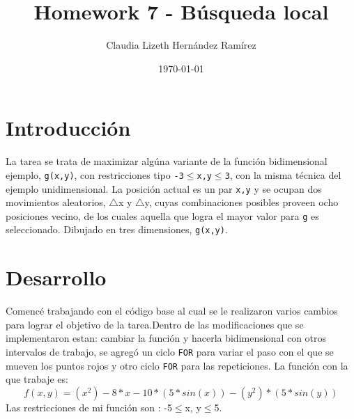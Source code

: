 \documentclass{article}
\author{Claudia Lizeth Hern\'andez Ram\'irez} %
\title{Homework 7 - B\'usqueda local} %
\date{\today}
\begin{document}

\maketitle %



\section{Introducci\'{o}n}\label{intro} %
La tarea se trata de maximizar alg\'una variante de la funci\'on bidimensional ejemplo, \texttt{g(x,y)}, con restricciones tipo \texttt{-3$\leq$x,y$\leq$3}, con la misma t\'ecnica del ejemplo unidimensional. La posici\'on actual es un par \texttt{x,y} y se ocupan dos movimientos aleatorios, $\triangle$x y $\triangle$y, cuyas combinaciones posibles proveen ocho posiciones vecino, de los cuales aquella que logra el mayor valor para \texttt{g} es seleccionado. Dibujado en tres dimensiones, \texttt{g(x,y)}.


\section{Desarrollo}\label{desarrollo} %
Comenc\'e trabajando con el c\'odigo base\citep{CBase} al cual se le realizaron varios cambios para lograr el objetivo de la tarea.Dentro de las modificaciones que se implementaron estan: cambiar la funci\'on y hacerla bidimensional con otros intervalos de trabajo, se agreg\'o un ciclo \texttt{FOR} para variar el paso con el que se mueven los puntos rojos y otro ciclo \texttt{FOR} para las repeticiones. \newline
La funci\'on con la que trabaje es:
\begin{equation}
f(x,y) = (x^2) -8 * x -10 * (5 * sin(x)) - (y^2) * (5* sin(y))
\label{funcion}
\end{equation}
Las restricciones de mi funci\'on son : -5$\leq$x, y$\leq$5.
\end{document}
